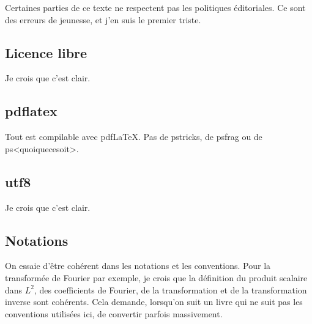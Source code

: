 Certaines parties de ce texte ne respectent pas les politiques éditoriales. Ce sont des erreurs de jeunesse, et j'en suis le premier triste.

\subsection{Licence libre}

Je crois que c'est clair.

\subsection{pdflatex}

Tout est compilable avec pdf\LaTeX. Pas de pstricks, de psfrag ou de ps<quoiquecesoit>.

\subsection{utf8}

Je crois que c'est clair.

\subsection{Notations}

On essaie d'être cohérent dans les notations et les conventions. Pour la transformée de Fourier par exemple, je crois que la définition du produit scalaire dans \( L^2\), des coefficients de Fourier, de la transformation et de la transformation inverse sont cohérents. Cela demande, lorsqu'on suit un livre qui ne suit pas les conventions utilisées ici, de convertir parfois massivement.

